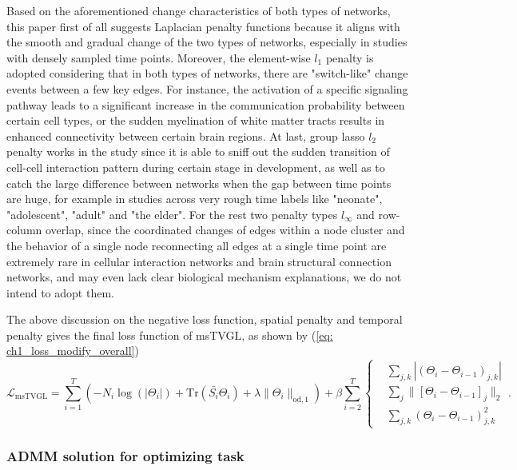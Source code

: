 Based on the aforementioned change characteristics of both types of networks, 
this paper first of all suggests Laplacian penalty functions because it aligns with the smooth and gradual change of the two types of networks, 
especially in studies with densely sampled time points.
Moreover, the element-wise $l_1$ penalty is adopted considering that in both types of networks, 
there are "switch-like" change events between a few key edges. 
For instance, the activation of a specific signaling pathway leads to a significant increase in the communication probability between certain cell types, 
or the sudden myelination of white matter tracts results in enhanced connectivity between certain brain regions.
At last, group lasso $l_2$ penalty works in the study since it is able to sniff out the sudden transition of cell-cell interaction pattern during certain stage in development, 
as well as to catch the large difference between networks when the gap between time points are huge, 
for example in studies across very rough time labels like "neonate", "adolescent", "adult" and "the elder". 
For the rest two penalty types $l_{\infty}$ and row-column overlap, 
since the coordinated changes of edges within a node cluster 
and the behavior of a single node reconnecting all edges at a single time point are extremely rare in cellular interaction networks and brain structural connection networks, 
and may even lack clear biological mechanism explanations, 
we do not intend to adopt them.

The above discussion on the negative loss function, spatial penalty and temporal penalty gives the final loss function of msTVGL,
as shown by (\ref{eq: ch1_loss_modify_overall})
\begin{equation}
    \label{eq: ch1_loss_modify_overall}
    \mathcal{L}_{\text{msTVGL}} = \sum_{i=1}^{T}(-N_i\log(|\Theta_i|)+\text{Tr}(\bar{S_i}\Theta_i) + \lambda\|\Theta_i\|_{\text{od},1}) +
    \beta\sum_{i=2}^{T}\left\{\begin{aligned}
        &\sum_{j,k}|(\Theta_i-\Theta_{i-1})_{j,k}| \\
        &\sum_{j}\|[\Theta_i-\Theta_{i-1}]_j\|_2 \\
        &\sum_{j,k}(\Theta_i-\Theta_{i-1})^2_{j,k}
    \end{aligned}\right..
\end{equation}

\subsubsection{ADMM solution for optimizing task}


